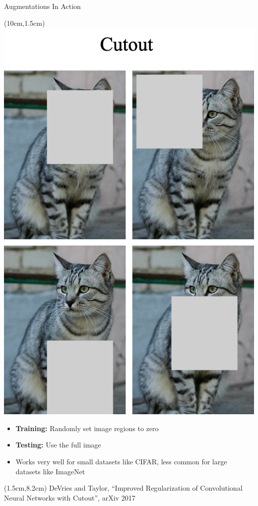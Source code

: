 \documentclass[serif, aspectratio=169]{beamer}
\begin{document}
\begin{frame}{Augmentations In Action}
	\begin{textblock*}{5cm}(10cm,1.5cm) %
		\includegraphics[keepaspectratio, scale=0.18]{pic/cutout}
	\end{textblock*}

	\begin{itemize}
		\item \textbf{Training:} Randomly set image regions to zero
		\item \textbf{Testing:} Use the full image
		\item Works very well for small datasets like CIFAR, less \newline common for large datasets like ImageNet
	\end{itemize}

	\begin{textblock*}{10cm}(1.5cm,8.2cm) %
		\tiny{DeVries and Taylor, ``Improved Regularization of Convolutional
		Neural Networks with Cutout'', arXiv 2017}
	\end{textblock*}	

	
\end{frame}
\end{document}
